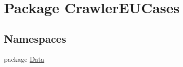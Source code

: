 \hypertarget{namespace_crawler_e_u_cases}{\section{Package Crawler\-E\-U\-Cases}
\label{namespace_crawler_e_u_cases}
}
\subsection*{Namespaces}
\begin{DoxyCompactItemize}
\item 
package \hyperlink{namespace_crawler_e_u_cases_1_1_data}{Data}
\end{DoxyCompactItemize}
